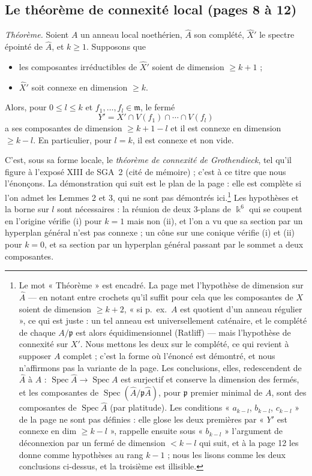 \documentclass[11pt,a4paper]{article}
\begin{document}
\subsection*{Le théorème de connexité local (pages 8 à 12)}

\emph{Théorème.} Soient $A$ un anneau local noethérien, $\widehat{A}$ son
complété, $\widehat{X}'$ le spectre épointé de $\widehat{A}$, et $k \geq 1$.
Supposons que
\begin{itemize}
\item[(i)] les composantes irréductibles de $\widehat{X}'$ soient de dimension
$\geq k+1$ ;
\item[(ii)] $\widehat{X}'$ soit connexe en dimension $\geq k$.
\end{itemize}
Alors, pour $0 \leq l \leq k$ et $f_1, \ldots, f_l \in \mathfrak{m}$, le fermé
\[
  Y' = X' \cap V(f_1) \cap \cdots \cap V(f_l)
\]
a ses composantes de dimension $\geq k+1-l$ et il est connexe en dimension
$\geq k-l$. En particulier, pour $l = k$, il est connexe et non vide.

C'est, sous sa forme locale, le \emph{théorème de connexité de Grothendieck},
tel qu'il figure à l'exposé XIII de SGA~2 (cité de mémoire) ; c'est à ce titre
que nous l'énonçons. La démonstration qui suit est le plan de la page : elle
est complète si l'on admet les Lemmes 2 et 3, qui ne sont pas démontrés
ici.\footnote{Le mot « Théorème » est encadré.
La page met l'hypothèse de dimension sur $\widehat{A}$ --- en notant entre
crochets qu'il suffit pour cela que les composantes de $X$ soient de dimension
$\geq k+2$, « si p.~ex.\ $A$ est quotient d'un anneau régulier », ce qui est
juste : un tel anneau est universellement caténaire, et le complété de
chaque $A/\mathfrak{p}$ est alors équidimensionnel (Ratliff) --- mais
l'hypothèse de connexité sur $X'$. Nous mettons les deux sur le complété, ce
qui revient à supposer $A$ complet ; c'est la forme où l'énoncé est démontré,
et nous n'affirmons pas la variante de la page. Les conclusions, elles,
redescendent de $\widehat{A}$ à $A$ : $\operatorname{Spec}\widehat{A} \to
\operatorname{Spec} A$ est surjectif et conserve la dimension des fermés, et
les composantes de $\operatorname{Spec}(\widehat{A}/\mathfrak{p}\widehat{A})$,
pour $\mathfrak{p}$ premier minimal de $A$, sont des composantes de
$\operatorname{Spec}\widehat{A}$ (par platitude). Les conditions
« $a_{k-l}$, $b_{k-l}$, $c_{k-l}$ » de la page ne sont pas définies : elle
glose les deux premières par « $Y'$ est connexe en dim $\geq k-l$ », rappelle
ensuite sous « $b_{k-l}$ » l'argument de déconnexion par un fermé de dimension
$< k-l$ qui suit, et à la page 12 les donne comme hypothèses au rang $k-1$ ;
nous les lisons comme les deux conclusions ci-dessus, et la troisième est
illisible.} Les hypothèses et la borne sur $l$
sont nécessaires : la réunion de deux $3$-plans de $\Bbbk^6$ qui se coupent en
l'origine vérifie (i) pour $k = 1$ mais non (ii), et l'on a vu que sa section
par un hyperplan général n'est pas connexe ; un cône sur une conique vérifie (i) et (ii) pour
$k = 0$, et sa section par un hyperplan général passant par le sommet a deux
composantes.
\end{document}
